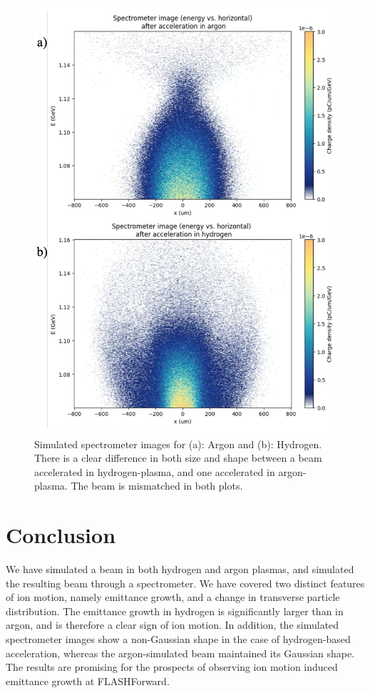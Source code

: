 \documentclass[a4paper,
               biblatex,     %
               ]{jacow}
\begin{document}
\begin{figure}
    \centering
    \includegraphics[width=0.8\linewidth]{TUPS013_f5.pdf}
    \caption{Simulated spectrometer images for (a): Argon and (b): Hydrogen. There is a clear difference in both size and shape between a beam accelerated in hydrogen-plasma, and one accelerated in argon-plasma. The beam is mismatched in both plots.}
    \label{fig:Spec_both}
\end{figure}

\section{Conclusion}
We have simulated a beam in both hydrogen and argon plasmas, and simulated the resulting beam through a spectrometer. We have covered two distinct features of ion motion, namely emittance growth, and a change in transverse particle distribution. The emittance growth in hydrogen is significantly larger than in argon, and is therefore a clear sign of ion motion. In addition, the simulated spectrometer images show a non-Gaussian shape in the case of hydrogen-based acceleration, whereas the argon-simulated beam maintained its Gaussian shape. The results are promising for the prospects of observing ion motion induced emittance growth at FLASHForward.
\end{document}
